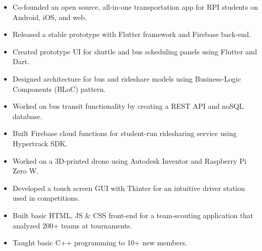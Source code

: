 \documentclass[10pt,a4paper,ragged2e]{altacv}
\begin{document}
\begin{itemize}
\item Co-founded an open source, all-in-one transportation app for RPI students on Android, iOS, and web.
\item Released a stable prototype with Flutter framework and Firebase back-end.
\item Created prototype UI for shuttle and bus scheduling panels using Flutter and Dart.
\item Designed architecture for bus and rideshare models using Business-Logic Components (BLoC) pattern.
\item Worked on bus transit functionality by creating a REST API and noSQL database.
\item Built Firebase cloud functions for student-run ridesharing service using Hypertrack SDK.
\end{itemize}

\divider



\begin{itemize}
\item Worked on a 3D-printed drone using Autodesk Inventor and Raspberry Pi Zero W.
\item Developed a touch screen GUI with Tkinter for an intuitive driver station used in competitions.
\item Built basic HTML, JS \& CSS front-end for a team-scouting application that analyzed 200+ teams at tournaments.
\item Taught basic C++ programming to 10+ new members.
\end{itemize}


\clearpage


\nocite{*}


\end{document}

